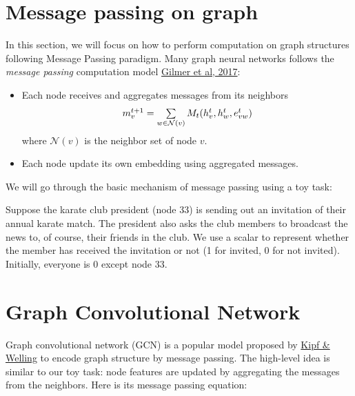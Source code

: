 \section{Message passing on graph}
 In this section, we will focus on how to perform computation on graph structures following Message Passing paradigm. Many graph neural networks follows the \textit{message passing} computation model \href{https://arxiv.org/abs/1704.01212}{Gilmer et al, 2017}:
\begin{itemize}
    \item Each node receives and aggregates messages from its neighbors  
\begin{gather}
$$m_v^{t+1} = \sum\limits_{w\in \mathcal{N}(v)}M_t(h_v^t, h_w^t, e_{vw}^t)$$
\end{gather}
where $\mathcal{N}(v)$ is the neighbor set of node $v$.

\item Each node update its own embedding using aggregated messages.
\end{itemize}



We will go through the basic mechanism of message passing using a toy task:

Suppose the karate club president (node 33) is sending out an invitation of their annual karate match. The president also asks the club members to broadcast the news to, of course, their friends in the club. We use a scalar to represent whether the member has received the invitation or not (1 for invited, 0 for not invited). Initially, everyone is 0 except node 33.

\section{Graph Convolutional Network}

Graph convolutional network (GCN) is a popular model proposed by \href{https://arxiv.org/abs/1609.02907}{Kipf & Welling} to encode graph structure by message passing. The high-level idea is similar to our toy task: node features are updated by aggregating the messages from the neighbors. Here is its message passing equation:

